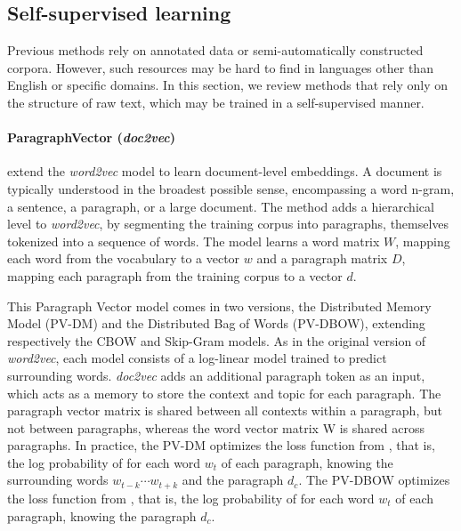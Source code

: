 
\subsection{Self-supervised learning}

Previous methods rely on annotated data or semi-automatically constructed corpora. However, such resources may be hard to find in languages other than English or specific domains. In this section, we review methods that rely only on the structure of raw text, which may be trained in a self-supervised manner. 

\paragraph{ParagraphVector (\textsl{doc2vec})} \textcite{le_14} extend the \textsl{word2vec} model \parencite{mikolov_13b} to learn document-level embeddings. A document is typically understood in the broadest possible sense, encompassing a word n-gram, a sentence, a paragraph, or a large document. The method adds a hierarchical level to \textsl{word2vec}, by segmenting the training corpus into paragraphs, themselves tokenized into a sequence of words. The model learns a word matrix $W$, mapping each word from the vocabulary to a vector $w$ and a paragraph matrix $D$, mapping each paragraph from the training corpus to a vector $d$. 

This Paragraph Vector model comes in two versions, the Distributed Memory Model (PV-DM) and the Distributed Bag of Words (PV-DBOW), extending respectively the CBOW and Skip-Gram models. As in the original version of \textsl{word2vec}, each model consists of a log-linear model trained to predict surrounding words. \textsl{doc2vec} adds an additional paragraph token as an input, which acts as a memory to store the context and topic for each paragraph. The paragraph vector matrix is shared between all contexts within a paragraph, but not between paragraphs, whereas the word vector matrix W is shared across paragraphs. In practice, the PV-DM optimizes the  loss function from , that is, the log probability of for each word $w_t$ of each paragraph, knowing the surrounding words $w_{t-k} \cdots w_{t+k}$ and the paragraph $d_c$. The PV-DBOW optimizes the loss function from , that is, the log probability of for each word $w_t$ of each paragraph, knowing the paragraph $d_c$.

